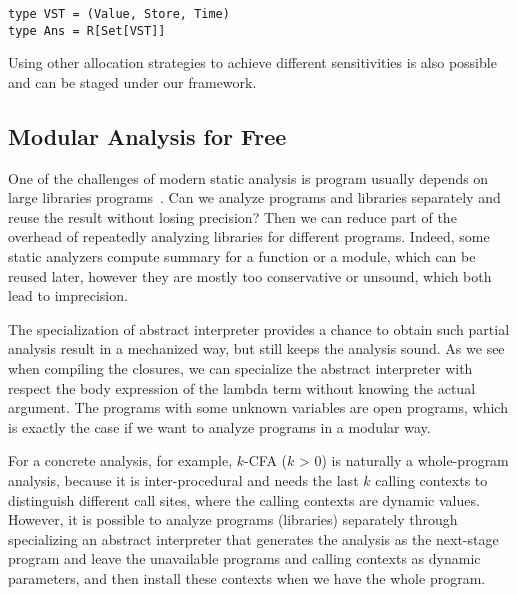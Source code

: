 \begin{lstlisting}
type VST = (Value, Store, Time)
type Ans = R[Set[VST]]
\end{lstlisting}

Using other allocation strategies to achieve different sensitivities is also
possible \cite{DBLP:conf/icfp/Gilray0M16} and can be staged under our framework.


\subsection{Modular Analysis for Free}


One of the challenges of modern static analysis is program usually depends on
large libraries programs~\cite{toman_et_al:LIPIcs:2017:7121}. Can we analyze
programs and libraries separately and reuse the result without losing precision?
Then we can reduce part of the overhead of repeatedly analyzing libraries for
different programs. Indeed, some static analyzers compute summary for a function
or a module, which can be reused later, however they are mostly too conservative
or unsound, which both lead to imprecision.

The specialization of abstract interpreter provides a chance to obtain such
partial analysis result in a mechanized way, but still keeps the analysis sound.
As we see when compiling the closures, we can specialize the abstract
interpreter with respect the body expression of the lambda term without knowing
the actual argument. The programs with some unknown variables are open programs,
which is exactly the case if we want to analyze programs in a modular way.

For a concrete analysis, for example, $k$-CFA ($k$ > 0) is naturally a
whole-program analysis, because it is inter-procedural and needs the last $k$
calling contexts to distinguish different call sites, where the calling contexts
are dynamic values. However, it is possible to analyze programs (libraries)
separately through specializing an abstract interpreter that generates the
analysis as the next-stage program and leave the unavailable programs and
calling contexts as dynamic parameters, and then install these contexts when we
have the whole program.

